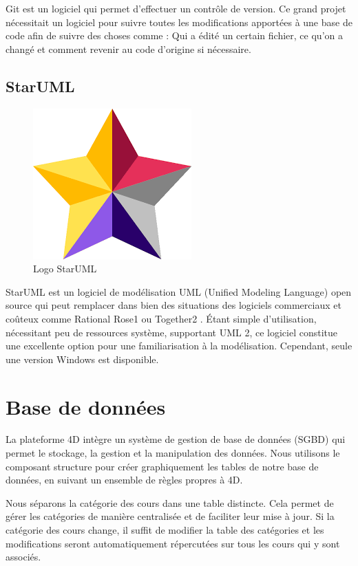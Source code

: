 Git est un logiciel qui permet d’effectuer un contrôle de
 version. Ce grand projet nécessitait un 
 logiciel pour suivre toutes les modifications apportées à une base de code afin de suivre des choses comme : Qui a édité un certain fichier, ce qu'on a changé et comment revenir au code d'origine si nécessaire.

 \subsection{StarUML}

 \begin{figure}[H]
    \centering
    \includegraphics[scale=0.4]{Logos/starUml.png}
    \caption{Logo  StarUML}
\end{figure}
 
 StarUML est un logiciel de modélisation UML (Unified Modeling Language) open source
qui peut remplacer dans bien des situations des logiciels commerciaux et coûteux
comme Rational Rose1 ou Together2
. Étant simple d’utilisation, nécessitant peu de
ressources système, supportant UML 2, ce logiciel constitue une excellente option pour
une familiarisation à la modélisation. Cependant, seule une version Windows est disponible. \cite{StarUml}

\section{Base de données }

La plateforme 4D intègre un système de gestion de base de données (SGBD) qui permet le stockage, la gestion et la manipulation des données. Nous utilisons le composant structure pour créer graphiquement les tables de notre base de données, en suivant un ensemble de règles propres à 4D.

Nous séparons la catégorie des cours dans une table distincte. Cela permet de gérer les catégories de manière centralisée et de faciliter leur mise à jour. Si la catégorie des cours change, il suffit de modifier la table des catégories et les modifications seront automatiquement répercutées sur tous les cours qui y sont associés.

